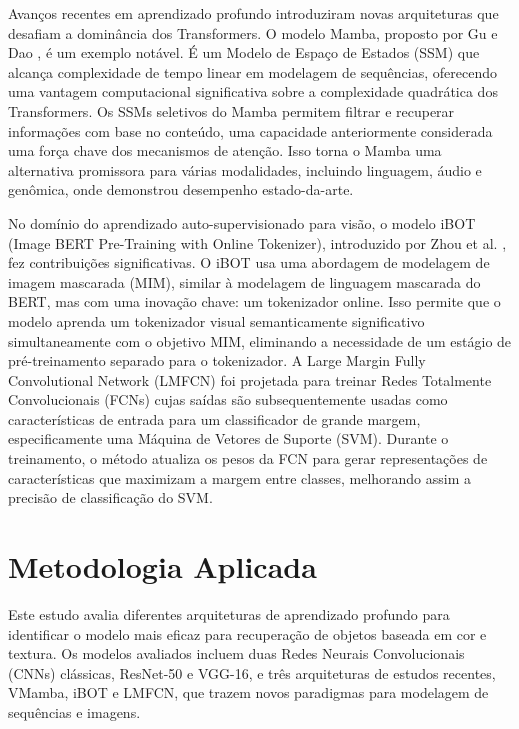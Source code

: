 \documentclass[conference]{IEEEtran}
\begin{document}
Avan\c{c}os recentes em aprendizado profundo introduziram novas arquiteturas que desafiam a domin\^{a}ncia dos Transformers. O modelo Mamba, proposto por Gu e Dao \cite{b16}, \'{e} um exemplo not\'{a}vel. \'{E} um Modelo de Espa\c{c}o de Estados (SSM) que alcan\c{c}a complexidade de tempo linear em modelagem de sequ\^{e}ncias, oferecendo uma vantagem computacional significativa sobre a complexidade quadr\'{a}tica dos Transformers. Os SSMs seletivos do Mamba permitem filtrar e recuperar informa\c{c}\~{o}es com base no conte\'{u}do, uma capacidade anteriormente considerada uma for\c{c}a chave dos mecanismos de aten\c{c}\~{a}o. Isso torna o Mamba uma alternativa promissora para v\'{a}rias modalidades, incluindo linguagem, \'{a}udio e gen\^{o}mica, onde demonstrou desempenho estado-da-arte.

No dom\'{i}nio do aprendizado auto-supervisionado para vis\~{a}o, o modelo iBOT (Image BERT Pre-Training with Online Tokenizer), introduzido por Zhou et al. \cite{b17}, fez contribui\c{c}\~{o}es significativas. O iBOT usa uma abordagem de modelagem de imagem mascarada (MIM), similar \`{a} modelagem de linguagem mascarada do BERT, mas com uma inova\c{c}\~{a}o chave: um tokenizador online. Isso permite que o modelo aprenda um tokenizador visual semanticamente significativo simultaneamente com o objetivo MIM, eliminando a necessidade de um est\'{a}gio de pr\'{e}-treinamento separado para o tokenizador. A Large Margin Fully Convolutional Network (LMFCN) foi projetada para treinar Redes Totalmente Convolucionais (FCNs) cujas sa\'{i}das s\~{a}o subsequentemente usadas como caracter\'{i}sticas de entrada para um classificador de grande margem, especificamente uma M\'{a}quina de Vetores de Suporte (SVM). Durante o treinamento, o m\'{e}todo atualiza os pesos da FCN para gerar representa\c{c}\~{o}es de caracter\'{i}sticas que maximizam a margem entre classes, melhorando assim a precis\~{a}o de classifica\c{c}\~{a}o do SVM.


\section{Metodologia Aplicada}

Este estudo avalia diferentes arquiteturas de aprendizado profundo para identificar o modelo mais eficaz para recupera\c{c}\~{a}o de objetos baseada em cor e textura. Os modelos avaliados incluem duas Redes Neurais Convolucionais (CNNs) cl\'{a}ssicas, ResNet-50 e VGG-16, e tr\^{e}s arquiteturas de estudos recentes, VMamba, iBOT e LMFCN, que trazem novos paradigmas para modelagem de sequ\^{e}ncias e imagens.
\end{document}
